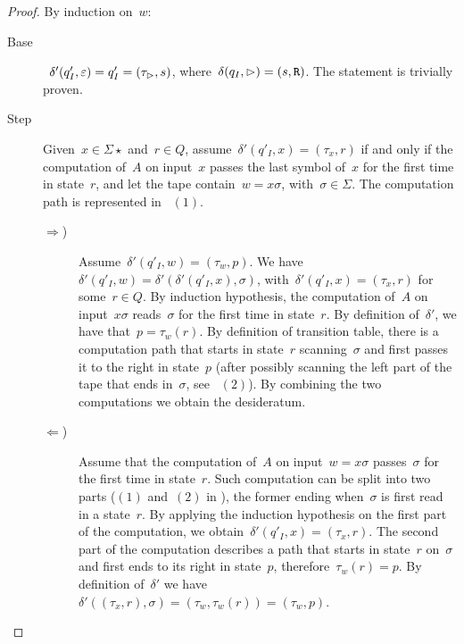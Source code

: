\begin{proof}
	By induction on~$w$:
	\begin{description}
		\item[Base]~$\delta'(q'_I,\varepsilon)=q'_I=(\tau_\rhd,s)$, where~$\delta(q_I,\rhd)=(s,\mathtt R)$. The statement is trivially proven.
		\item[Step] Given~$x\in\Sigma\star$ and~$r\in Q$, assume~$\delta'(q'_I,x)=(\tau_x,r)$ if and only if the computation of~$A$ on input~$x$ passes the last symbol of~$x$ for the first time in state~$r$, and let the tape contain~$w=x\sigma$, with~$\sigma\in\Sigma$. The computation path is represented in ~$(1)$.
		      \begin{description}
			      \item[$\Rightarrow$)] Assume~$\delta'(q'_I,w)=(\tau_w,p)$.
			            We have~$\delta'(q'_I,w)=\delta'(\delta'(q'_I,x),\sigma)$, with~$\delta'(q'_I,x)=(\tau_x,r)$ for some~$r\in Q$.
			            By induction hypothesis, the computation of~$A$ on input~$x\sigma$ reads~$\sigma$ for the first time in state~$r$.
			            By definition of~$\delta'$, we have that~$p=\tau_w(r)$.
			            By definition of transition table, there is a computation path that starts in state~$r$ scanning~$\sigma$ and first passes it to the right in state~$p$ (after possibly scanning the left part of the tape that ends in~$\sigma$, see ~$(2)$).
			            By combining the two computations we obtain the desideratum.
			      \item[$\Leftarrow$)] Assume that the computation of~$A$ on input~$w=x\sigma$ passes~$\sigma$ for the first time in state~$r$.
			            Such computation can be split into two parts ($(1)$ and~$(2)$ in ), the former ending when~$\sigma$ is first read in a state~$r$.
			            By applying the induction hypothesis on the first part of the computation, we obtain~$\delta'(q'_I,x)=(\tau_x,r)$.
			            The second part of the computation describes a path that starts in state~$r$ on~$\sigma$ and first ends to its right in state~$p$, therefore~$\tau_w(r)=p$.
			            By definition of~$\delta'$ we have~$\delta'((\tau_x,r),\sigma)=(\tau_w,\tau_w(r))=(\tau_w,p)$. \qedhere
		      \end{description}
	\end{description}
\end{proof}

